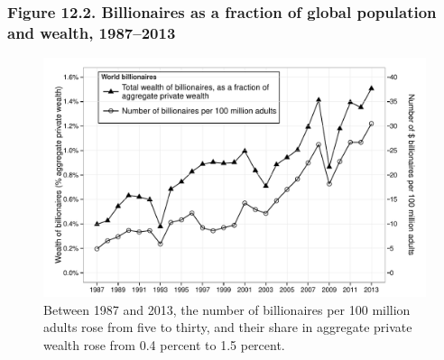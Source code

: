 \documentclass[t]{beamer}\usepackage[]{graphicx}\usepackage[]{color}
\newenvironment{knitrout}{}{} %
\begin{document}
\begin{frame}[label=Figure_12_2]
\frametitle{Figure 12.2. Billionaires as a fraction of global population and wealth, 1987--2013}
\begin{figure}[t]
\begin{minipage}[b]{\textwidth}
\centering

\begin{knitrout}\footnotesize
{}\color{fgcolor}

{\centering \includegraphics[width=1\linewidth]{figures/bw/Figure_12_2} 

}



\end{knitrout}
\caption{Between 1987 and 2013, the number of billionaires per 100 million adults rose from five to thirty, and their share in aggregate private wealth rose from 0.4 percent to 1.5 percent.}
\end{minipage}
\end{figure}
\end{frame}
\end{document}
